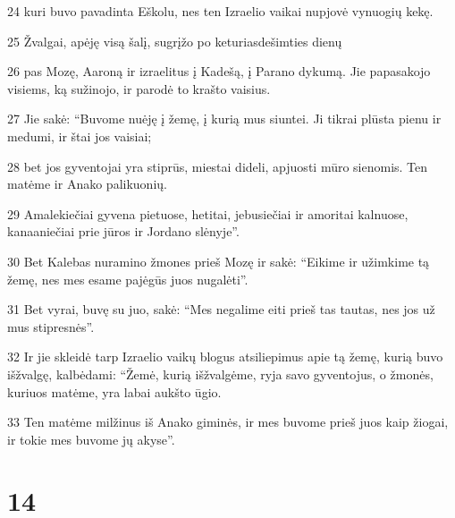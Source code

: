\par 24 kuri buvo pavadinta Eškolu, nes ten Izraelio vaikai nupjovė vynuogių kekę. 
\par 25 Žvalgai, apėję visą šalį, sugrįžo po keturiasdešimties dienų 
\par 26 pas Mozę, Aaroną ir izraelitus į Kadešą, į Parano dykumą. Jie papasakojo visiems, ką sužinojo, ir parodė to krašto vaisius. 
\par 27 Jie sakė: “Buvome nuėję į žemę, į kurią mus siuntei. Ji tikrai plūsta pienu ir medumi, ir štai jos vaisiai; 
\par 28 bet jos gyventojai yra stiprūs, miestai dideli, apjuosti mūro sienomis. Ten matėme ir Anako palikuonių. 
\par 29 Amalekiečiai gyvena pietuose, hetitai, jebusiečiai ir amoritai kalnuose, kanaaniečiai prie jūros ir Jordano slėnyje”. 
\par 30 Bet Kalebas nuramino žmones prieš Mozę ir sakė: “Eikime ir užimkime tą žemę, nes mes esame pajėgūs juos nugalėti”. 
\par 31 Bet vyrai, buvę su juo, sakė: “Mes negalime eiti prieš tas tautas, nes jos už mus stipresnės”. 
\par 32 Ir jie skleidė tarp Izraelio vaikų blogus atsiliepimus apie tą žemę, kurią buvo išžvalgę, kalbėdami: “Žemė, kurią išžvalgėme, ryja savo gyventojus, o žmonės, kuriuos matėme, yra labai aukšto ūgio. 
\par 33 Ten matėme milžinus iš Anako giminės, ir mes buvome prieš juos kaip žiogai, ir tokie mes buvome jų akyse”.



\chapter{14}

